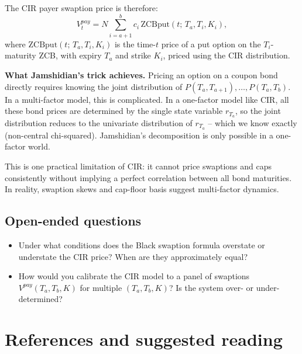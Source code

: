 \documentclass[11pt]{article}
\begin{document}
The CIR payer swaption price is therefore:
\[
V_t^{pay}
= N\sum_{i=a+1}^{b} c_i\,\text{ZCBput}(t;\,T_a,T_i,K_i),
\]
where $\text{ZCBput}(t;\,T_a,T_i,K_i)$ is the time-$t$ price of a put
option on the $T_i$-maturity ZCB, with expiry $T_a$ and strike $K_i$,
priced using the CIR distribution.

\begin{example_box}
\textbf{What Jamshidian's trick achieves.}  Pricing an option on a coupon
bond directly requires knowing the joint distribution of
$P(T_a,T_{a+1}),\ldots,P(T_a,T_b)$.  In a multi-factor model, this is
complicated.  In a one-factor model like CIR, all these bond prices are
determined by the single state variable $r_{T_a}$, so the joint
distribution reduces to the univariate distribution of $r_{T_a}$ -- which
we know exactly (non-central chi-squared).  Jamshidian's decomposition is
only possible in a one-factor world.

This is one practical limitation of CIR: it cannot price swaptions and
caps consistently without implying a perfect correlation between all bond
maturities.  In reality, swaption skews and cap-floor basis suggest
multi-factor dynamics.
\end{example_box}

\subsection*{Open-ended questions}
\begin{itemize}
  \item Under what conditions does the Black swaption formula overstate or
  understate the CIR price?  When are they approximately equal?
  \item How would you calibrate the CIR model to a panel of swaptions
  $V^{pay}(T_a, T_b, K)$ for multiple $(T_a,T_b,K)$?  Is the system
  over- or under-determined?
\end{itemize}

\newpage
\section*{References and suggested reading}
\end{document}
